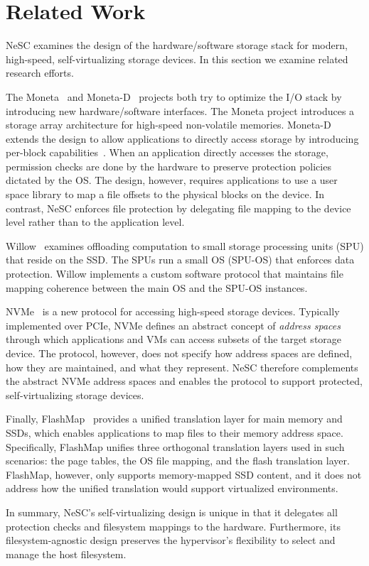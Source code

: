\chapter{Related Work}
\label{chap:related}

NeSC examines the design of the hardware/software storage stack for modern, high-speed, self-virtualizing storage devices. In this section we examine related research efforts.

The Moneta~\cite{caulfield10moneta} and Moneta-D~\cite{caulfield12moneta-d} projects both try to optimize the I/O stack by introducing new hardware/software interfaces.
The Moneta project introduces a storage array architecture for high-speed non-volatile memories. Moneta-D extends the design to allow applications
to directly access storage by introducing per-block capabilities~\cite{levy1984capability}. When an application directly accesses the storage, permission checks are done by the hardware to preserve protection policies dictated by the OS.
The design, however, requires applications to use a user space library to map a file offsets to the physical blocks on the device.
In contrast, NeSC enforces file protection by delegating file mapping to the device level rather than to the application level.

Willow~\cite{seshadri2014willow} examines offloading computation to small storage processing units (SPU) that reside on the SSD. The SPUs run a small OS (SPU-OS) that enforces data protection. Willow implements a custom software protocol that maintains file mapping coherence between the main OS and the SPU-OS instances.

NVMe~\cite{nvme} is a new protocol for accessing high-speed storage devices. Typically implemented over PCIe, NVMe defines an abstract concept of \emph{address spaces} through which applications and VMs can access subsets of the target storage device. The protocol, however, does not specify how address spaces are defined, how they are maintained, and what they represent. 
NeSC therefore complements the abstract NVMe address spaces and enables the protocol to support protected, self-virtualizing storage devices.

Finally, FlashMap~\cite{huang2015unified} provides a unified translation layer for main memory and SSDs, which enables applications to map files to their memory address space. Specifically, FlashMap unifies three orthogonal translation layers used in such scenarios: the page tables, the OS file mapping, and the flash translation layer.
FlashMap, however, only supports memory-mapped SSD content, and it does not address how the unified translation would support virtualized environments.

In summary, NeSC's self-virtualizing design is unique in that it delegates all protection checks and filesystem mappings to the hardware. Furthermore, its  filesystem-agnostic design preserves the hypervisor's flexibility to select and manage the host filesystem.





